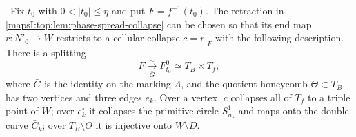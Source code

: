 \begin{proposition}
\label{mapsI:top:prop:verified-cellular-collapse}
\ Fix $t_0$ with $0<|t_0|\leq\eta$ and put $F=f^{-1}(t_0)$.  The
retraction in \cref{mapsI:top:lem:phase-spread-collapse} can be chosen so that its end
map $r:N'_0\to W$ restricts to a cellular collapse $c=r|_F$ with the following
description.  There is a splitting
\[
 F\xrightarrow[\bar G]{\sim}F_{t_0}^0\simeq T_B\times T_f,
\tag{TM.C.12}
\]
where $\bar G$ is the identity on the marking $\Lambda$, and the quotient
honeycomb $\Theta\subset T_B$ has two vertices and three edges $e_k$.  Over a
vertex, $c$ collapses all of $T_f$ to a triple point of $W$; over
$e_k^\circ$ it collapses the primitive circle $S^1_{n_k}$ and maps onto the
double curve $\bar C_k$; over $T_B\setminus\Theta$ it is injective onto
$W\setminus D$.
\end{proposition}

